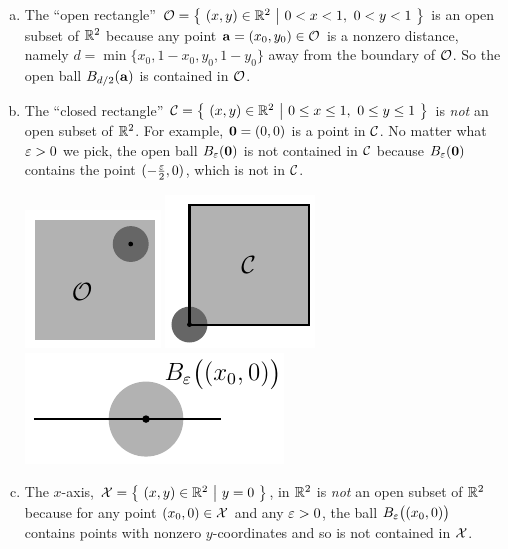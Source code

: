 \begin{eg}\label{ex:COopen}
\begin{enumerate}[(a)]
\item
The ``open rectangle'' 
           $\cO=\big\{\ (x,y)\in\bbbr^2\ \big|\ 0<x<1,\ 0<y<1\ \big\}$
is an open subset of $\mathbb{R}^2$ because any point $\mathbf{a}=(x_0,y_0)\in\mathcal{O}$
is a nonzero distance, namely $d=\min\big\{x_0,1-x_0,y_0,1-y_0\big\}$ away 
from the boundary of $\mathcal{O}$. So the open ball $B_{d/2}(\mathbf{a})$ is contained in
$\mathcal{O}$.

\item 
The ``closed rectangle'' 
   $\cC=\big\{\ (x,y)\in\bbbr^2\ \big|\ 0\le x \le 1,\ 0 \le y \le 1\ \big\}$ 
is \emph{not} an open subset of $\mathbb{R}^2$. For example,
$\mathbf{0}=(0,0)$ is a point in $\mathcal{C}$. No matter what $\varepsilon>0$ we pick,
the open ball $B_\varepsilon(\mathbf{0})$ is not contained in $\mathcal{C}$ because
$B_\varepsilon(\mathbf{0})$ contains the point $(-\frac{\varepsilon}{2},0)$,
which is not in $\mathcal{C}$.

\begin{efig}
\begin{center}
    \includegraphics{openSquare.pdf}\qquad\quad
    \includegraphics{closedSquare.pdf}\qquad\quad
    \includegraphics{xAxis.pdf}\qquad
\end{center}
\end{efig}

\item
The $x$-axis, $\cX=\big\{\ (x,y)\in\bbbr^2\ \big|\ y=0\ \big\}$, 
in $\mathbb{R}^2$ is 
\emph{not} an open subset of $\mathbb{R}^2$ because for any point 
$(x_0,0)\in\mathcal{X}$ and 
any $\varepsilon>0$, the ball $B_\varepsilon\big((x_0,0)\big)$ contains points with 
nonzero $y$-coordinates and so is not contained in $\mathcal{X}$. 


\end{enumerate}
\end{eg}
